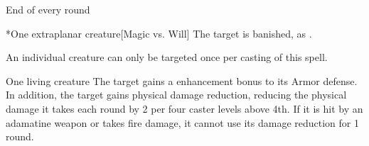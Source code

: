 \begin{spellheader}
    \spellrng{\rngmed}
\end{spellheader}
\begin{spelleffects}
    \begin{spelltrigger}{End of every round}
        \begin{spelltarget}*{One extraplanar creature}[Magic vs. Will]
            \spellsuccess The target is banished, as .
        \end{spelltarget}
    \end{spelltrigger}
    \spelleffect An individual creature can only be targeted once per casting of this spell.
\end{spelleffects}

\begin{spellheader}
    \spelldur{\durshort}
\end{spellheader}
\begin{spelleffects}
    \begin{spelltarget}{One living creature}
        \spelleffect The target gains a  enhancement bonus to its Armor defense. \spellbonusscalingdescription In addition, the target gains physical damage reduction, reducing the physical damage it takes each round by 2  per four caster levels above 4th. If it is hit by an adamatine weapon or takes fire damage, it cannot use its damage reduction for 1 round.
    \end{spelltarget}
\end{spelleffects}

